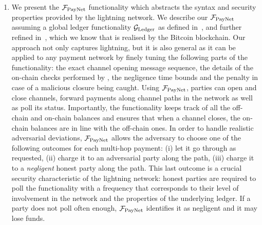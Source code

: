 \begin{enumerate}
\item We present the $\mathcal{F}_{\mathrm{PayNet}}{}$ functionality which abstracts the syntax and
security properties provided by the lightning network. We describe our
$\mathcal{F}_{\mathrm{PayNet}}{}$ assuming a global ledger functionality $\mathcal{G}_{\mathrm{Ledger}}$ as defined
in~\cite{BMTZ17}, and further refined in~\cite{genesis}, which we know that is
realised by the Bitcoin blockchain. Our approach not only captures lightning,
but it is also general as it can be applied to any payment network by finely
tuning the following parts of the functionality: the exact channel
opening message sequence, the details of the on-chain checks performed by
\fpaynet, the negligence time bounds and the penalty in case of a malicious
closure being caught. Using $\mathcal{F}_{\mathrm{PayNet}}{}$, parties can open and close channels,
forward payments along channel paths in the network as well as poll its status.
Importantly, the functionality keeps track of all the off-chain and on-chain
balances and ensures that when a channel closes, the on-chain balances
are in line with the off-chain ones. In order to handle
realistic adversarial deviations, $\mathcal{F}_{\mathrm{PayNet}}{}$ allows the
adversary to choose one of the following outcomes for each multi-hop
payment: (i) let it go through as requested, (ii) charge it to an adversarial
party along the path, (iii) charge it to a \emph{negligent} honest party along
the path. This last outcome is a crucial security characteristic of the
lightning network: honest parties are required to poll the
functionality with a frequency that corresponds to their level of
involvement in the network and the properties of the underlying ledger. If a
party does not poll often enough, $\mathcal{F}_{\mathrm{PayNet}}{}$ identifies it as
negligent and it may lose funds.


\end{enumerate}
